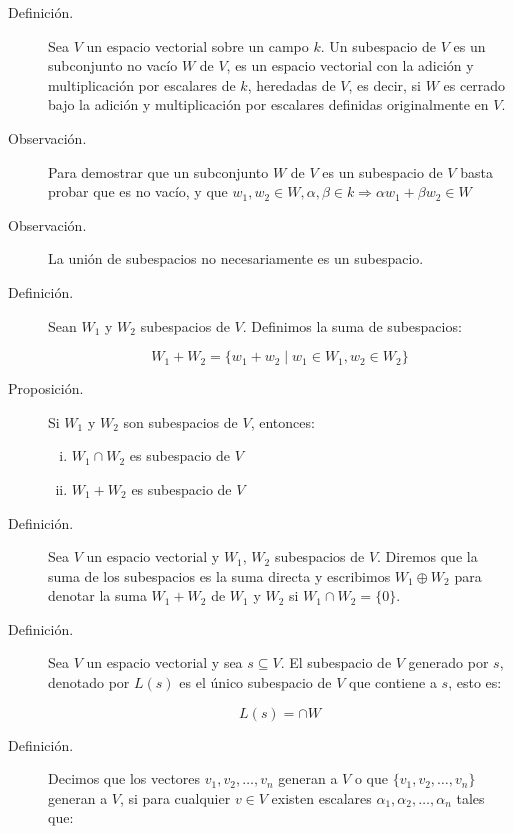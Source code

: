\documentclass[12pt]{article}
\begin{document}
\begin{description}
\item [Definición.] Sea $V$ un espacio vectorial sobre un campo $k$. Un subespacio de $V$ es un subconjunto no vacío $W$ de $V$, es un espacio vectorial con la adición y multiplicación por escalares de $k$, heredadas de $V$, es decir, si $W$ es cerrado bajo la adición y multiplicación por escalares definidas originalmente en $V$.

\item [Observación.] Para demostrar que un subconjunto $W$ de $V$ es un subespacio de $V$ basta probar que es no vacío, y que $w_1, w_2 \in W, \alpha, \beta \in k \Rightarrow \alpha w_1 + \beta w_2 \in W$

\item [Observación.] La unión de subespacios no necesariamente es un subespacio.

\item [Definición.] Sean $W_1$ y $W_2$ subespacios de $V$. Definimos la suma de subespacios:

\begin{equation}
W_1 + W_2 = \{ w_1 + w_2 \mid w_1 \in W_1, w_2 \in W_2\}
\end{equation}

\item [Proposición.] Si $W_1$ y $W_2$ son subespacios de $V$, entonces:

\begin{enumerate}[i)]
\item $W_1 \cap W_2$ es subespacio de $V$
\item $W_1 + W_2$ es subespacio de $V$
\end{enumerate}

\item [Definición.] Sea $V$ un espacio vectorial y $W_1$, $W_2$ subespacios de $V$. Diremos que la suma de los subespacios es la suma directa y escribimos $W_1 \oplus W_2$ para denotar la suma $W_1 + W_2$ de $W_1$ y $W_2$ si $W_1 \cap W_2 = \{ 0 \}$.

\item [Definición.] Sea $V$ un espacio vectorial y sea $s \subseteq V$. El subespacio de $V$ generado por $s$, denotado por $L(s)$ es el único subespacio de $V$ que contiene a $s$, esto es:

\begin{equation}
L(s) = \cap W
\end{equation}

\item [Definición.] Decimos que los vectores $v_1, v_2, \dots, v_n$ generan a $V$ o que $\{ v_1, v_2, \dots, v_n\}$ generan a $V$, si para cualquier $v \in V$ existen escalares $\alpha_1, \alpha_2, \dots, \alpha_n$ tales que:


\end{description}
\end{document}
